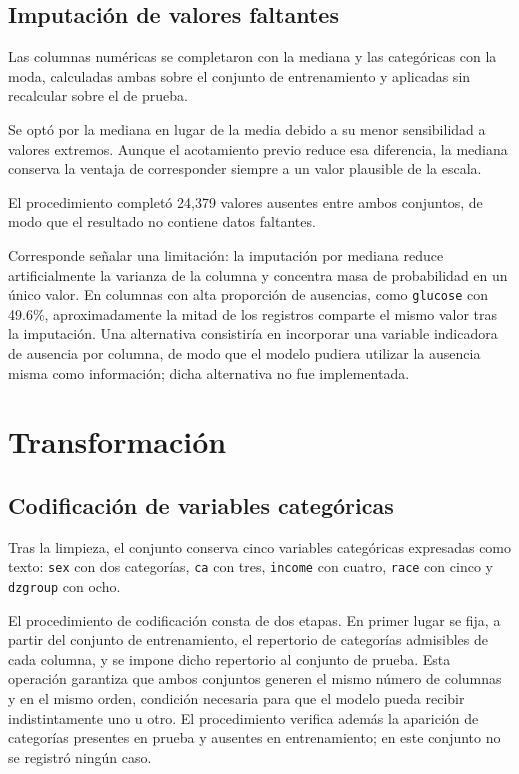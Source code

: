 \documentclass[11pt]{article}
\begin{document}
\subsection{Imputación de valores faltantes}

Las columnas numéricas se completaron con la mediana y las categóricas con la moda, calculadas
ambas sobre el conjunto de entrenamiento y aplicadas sin recalcular sobre el de prueba.

Se optó por la mediana en lugar de la media debido a su menor sensibilidad a valores extremos.
Aunque el acotamiento previo reduce esa diferencia, la mediana conserva la ventaja de corresponder
siempre a un valor plausible de la escala.

El procedimiento completó 24{,}379 valores ausentes entre ambos conjuntos, de modo que el
resultado no contiene datos faltantes.

Corresponde señalar una limitación: la imputación por mediana reduce artificialmente la varianza
de la columna y concentra masa de probabilidad en un único valor. En columnas con alta proporción
de ausencias, como \texttt{glucose} con 49.6\%, aproximadamente la mitad de los registros comparte
el mismo valor tras la imputación. Una alternativa consistiría en incorporar una variable
indicadora de ausencia por columna, de modo que el modelo pudiera utilizar la ausencia misma como
información; dicha alternativa no fue implementada.

\section{Transformación}
\label{sec:transformacion}

\subsection{Codificación de variables categóricas}

Tras la limpieza, el conjunto conserva cinco variables categóricas expresadas como texto:
\texttt{sex} con dos categorías, \texttt{ca} con tres, \texttt{income} con cuatro, \texttt{race}
con cinco y \texttt{dzgroup} con ocho.

El procedimiento de codificación consta de dos etapas. En primer lugar se fija, a partir del
conjunto de entrenamiento, el repertorio de categorías admisibles de cada columna, y se impone
dicho repertorio al conjunto de prueba. Esta operación garantiza que ambos conjuntos generen el
mismo número de columnas y en el mismo orden, condición necesaria para que el modelo pueda recibir
indistintamente uno u otro. El procedimiento verifica además la aparición de categorías presentes
en prueba y ausentes en entrenamiento; en este conjunto no se registró ningún caso.
\end{document}
